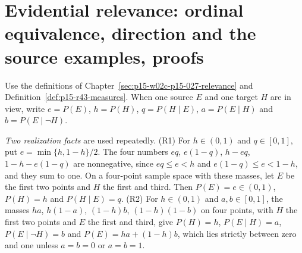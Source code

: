 \section{Evidential relevance: ordinal equivalence, direction and the source examples, proofs}
\label{sec:p15-w02c-p15-027-annex}

Use the definitions of Chapter~\ref{sec:p15-w02c-p15-027-relevance} and
Definition~\ref{def:p15-r43-measures}. When one source \(E\) and one
target \(H\) are in view, write \(e=P(E)\), \(h=P(H)\),
\(q=P(H\mid E)\), \(a=P(E\mid H)\) and \(b=P(E\mid\neg H)\).

\emph{Two realization facts} are used repeatedly.
(R1) For \(h\in(0,1)\) and \(q\in[0,1]\), put \(e=\min\{h,1-h\}/2\).
The four numbers \(eq\), \(e(1-q)\), \(h-eq\), \(1-h-e(1-q)\) are
nonnegative, since \(eq\leq e<h\) and \(e(1-q)\leq e<1-h\), and they
sum to one. On a four-point sample space with these masses, let \(E\) be
the first two points and \(H\) the first and third. Then \(P(E)=e\in(0,1)\),
\(P(H)=h\) and \(P(H\mid E)=q\).
(R2) For \(h\in(0,1)\) and \(a,b\in[0,1]\), the masses \(ha\),
\(h(1-a)\), \((1-h)b\), \((1-h)(1-b)\) on four points, with \(H\) the
first two points and \(E\) the first and third, give \(P(H)=h\),
\(P(E\mid H)=a\), \(P(E\mid\neg H)=b\) and \(P(E)=ha+(1-h)b\), which
lies strictly between zero and one unless \(a=b=0\) or \(a=b=1\).

